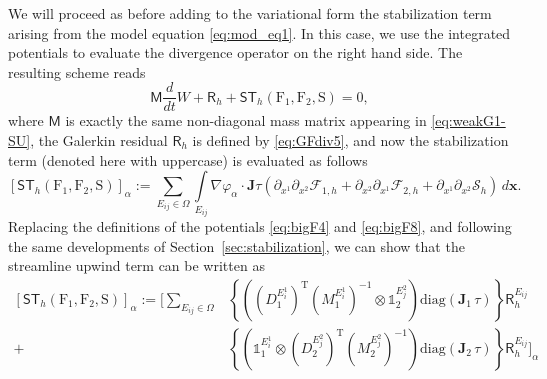 \documentclass[a4paper,10pt]{article}
\newcommand{\id}{\mathds{1}}
\begin{document}
We will proceed as before adding to the variational form the stabilization term arising from the model equation \eqref{eq:mod_eq1}. 
In this case, we  use the integrated potentials to evaluate   the divergence operator on the right hand side. 
The resulting scheme reads 
\begin{equation} \label{eq:weakG1-SUGF}
\mathsf{M}\dfrac{d}{dt}W + \mathsf{R}_h  + \mathsf{ST}_h(\mathrm{F}_1,\mathrm{F}_2,\mathrm{S}) =0,
\end{equation}
where $\mathsf{M}$ is exactly the same non-diagonal mass matrix appearing in \eqref{eq:weakG1-SU}, the Galerkin residual  $\mathsf{R}_h$ is defined by \eqref{eq:GFdiv5},
and now the stabilization term  (denoted here with uppercase) is evaluated as follows 
 \begin{equation} \label{eq:weakG2-SUGF}
[ \mathsf{ST}_h(\mathrm{F}_1,\mathrm{F}_2,\mathrm{S})]_{\alpha}  :=  \sum_{E_{ij}\in\Omega}\int\limits_{E_{ij}} \nabla \varphi_{\alpha} \cdot\mathbf{J}\tau \left( \partial_{x^1}\partial_{x^2}\mathcal{F}_{1,h}
+\partial_{x^2}\partial_{x^1}\mathcal{F}_{2,h} + \partial_{x^1}\partial_{x^2}\mathcal{S}_{h} \right)\,d\mathbf{x}.
 \end{equation}
Replacing the definitions of the potentials \eqref{eq:bigF4} and \eqref{eq:bigF8}, and following the same developments of Section~\ref{sec:stabilization}, we can show that  the streamline upwind term can be written as 
 \begin{equation} \label{eq:weakG3-SUGF}
\begin{aligned}
\left[ \mathsf{ST}_h(\mathrm{F}_1,\mathrm{F}_2,\mathrm{S})\right]_{\alpha}  := \Bigg[ \sum_{E_{ij}\in\Omega} 
&\left\{ \left( (D_1^{E_i^{1}})^{\mathrm{T}}  (M_1^{E_i^{1}})^{-1} \otimes \id_2^{E_j^{2}} \right)   \textrm{diag}(\mathbf{J}_1 \,\tau)  \right\} 
\mathsf{R}_h^{E_{ij}}\\
+&\left\{ \left( \id_1^{E_i^{1}}  \otimes (D_2^{E_j^{2}})^{\mathrm{T}}  (M_2^{E_j^{2}})^{-1}   \right)   \textrm{diag}(\mathbf{J}_2 \,\tau)  \right\} 
\mathsf{R}_h^{E_{ij}}
\Bigg] _{\alpha}
\end{aligned}
 \end{equation}
\end{document}
